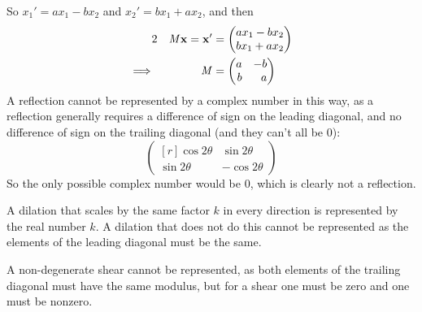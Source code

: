 \documentclass[fleqn,a4paper,11pt]{article}
\begin{document}
\begin{enumerate}[label=\textbf{\arabic*.}]
\begin{enumerate}[label=(\alph*)]
      So \(x_1' = ax_1 - bx_2\) and \(x_2' = bx_1 + ax_2\), and then
      \begin{alignat*}2
       && \mat M \vec x = \vec x' &=
       \begin{pmatrix}
        ax_1 - bx_2 \\ bx_1 + ax_2
       \end{pmatrix} \\
       \implies{}&& \mat M &=
       \begin{pmatrix*}[r]
        a & -b \\
        b & a
       \end{pmatrix*}
      \end{alignat*}
      A reflection cannot be represented by a complex number in this way, as a
      reflection generally requires a difference of sign on the leading
      diagonal, and no difference of sign on the trailing diagonal (and they
      can't all be \(0\)):
      \begin{equation*}
       \begin{pmatrix*}[r]
        \cos 2\theta & \sin 2\theta \\
        \sin 2\theta & -\cos 2\theta
       \end{pmatrix*}
      \end{equation*}
      So the only possible complex number would be \(0\), which is clearly not a
      reflection.

      A dilation that scales by the same factor \(k\) in every direction is
      represented by the real number \(k\). A dilation that does not do this
      cannot be represented as the elements of the leading diagonal must be the
      same.

      A non-degenerate shear cannot be represented, as both elements of the
      trailing diagonal must have the same modulus, but for a shear one must be
      zero and one must be nonzero.


\end{enumerate}
\end{enumerate}
\end{document}
